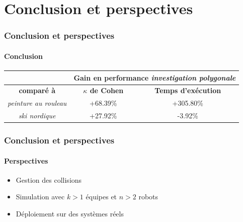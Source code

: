 \documentclass{beamer}
\begin{document}
	\section{Conclusion et perspectives}
		\begin{frame}
			\frametitle{Conclusion et perspectives}
			\framesubtitle{Conclusion}
			\begin{table}[H]
				\centering
				\begin{tabular}{|c|c|c|}
					\hline
					& \multicolumn{2}{c|}{\textbf{Gain en performance \textit{investigation polygonale}}} \\
					\hline
					\textbf{comparé à} & \textbf{$\kappa$ de Cohen} & \textbf{Temps d'exécution} \\
					\hline
					\textit{peinture au rouleau} & +68.39\% & +305.80\% \\
					\hline
					\textit{ski nordique} & +27.92\% & -3.92\% \\
					\hline
				\end{tabular}
			\end{table}
		\end{frame}
		\begin{frame}
			\frametitle{Conclusion et perspectives}
			\framesubtitle{Perspectives}
			\begin{itemize}
				\item Gestion des collisions
				\item Simulation avec $k > 1$ équipes et $n > 2$ robots
				\item Déploiement sur des systèmes réels
			\end{itemize}
		\end{frame}
\end{document}
